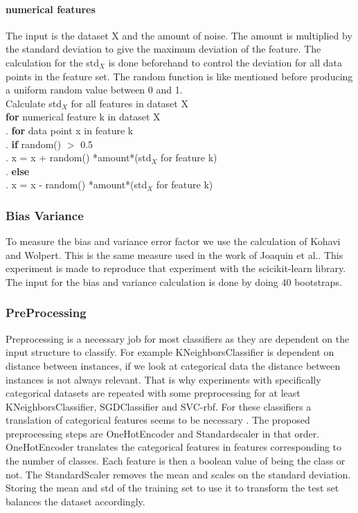 \documentclass[a4paper,10pt]{article}
\begin{document}
\paragraph{numerical features \newline}
The input is the dataset X and the amount of noise. The amount is multiplied by the standard deviation to give the maximum deviation of the feature. The calculation for the std$_X$ is done beforehand to control the deviation for all data points in the feature set. The random function is like mentioned before producing a uniform random value between 0 and 1.\\
Calculate std$_X$ for all features in dataset X\\
\textbf{for} numerical feature k in dataset X\\
.\hspace{1cm} \textbf{for} data point x in feature k\\
.\hspace{2cm} \textbf{if} random() $>$ 0.5 \\	
.\hspace{3cm} x = x + random() *amount*(std$_X$ for feature k)\\
.\hspace{2cm} \textbf{else}  \\	
.\hspace{3cm} x = x - random() *amount*(std$_X$ for feature k) 
\\

\subsubsection{Bias Variance}
To measure the bias and variance error factor we use the calculation of Kohavi and Wolpert\cite{BiasCalc}. This is the same measure used in the work of Joaquin et al.\cite{Bias-var}. This experiment is made to reproduce that experiment with the scicikit-learn library. The input for the bias and variance calculation is done by doing 40 bootstraps. 

\subsubsection{PreProcessing}
Preprocessing is a necessary job for most classifiers as they are dependent on the input structure to classify. For example KNeighborsClassifier is dependent on distance between instances, if we look at categorical data the distance between instances is not always relevant. That is why experiments with specifically categorical datasets are repeated with some preprocessing for at least KNeighborsClassifier, SGDClassifier and SVC-rbf. For these classifiers a translation of categorical features seems to be necessary \cite{KNN-Sym}\cite{SVM-sym}. The proposed preprocessing steps are OneHotEncoder and Standardscaler in that order. OneHotEncoder translates the categorical features in features corresponding to the number of classes. Each feature is then a boolean value of being the class or not. The StandardScaler removes the mean and scales on the standard deviation. Storing the mean and std of the training set to use it to transform the test set balances the dataset accordingly. 
\end{document}
